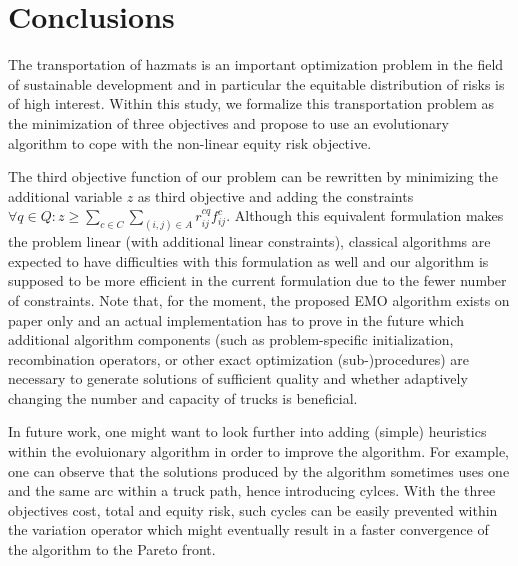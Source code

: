 \documentclass[preprint,12pt]{elsarticle}
\begin{document}
\section{Conclusions} \label{S_FW}
The transportation of hazmats is an important optimization problem in the field of sustainable development and in particular the equitable distribution of risks is of high interest. Within this study, we formalize this transportation problem as the minimization of three objectives and propose to use an evolutionary algorithm to cope with the non-linear equity risk objective.

The third objective function of our problem can be rewritten by minimizing the additional variable $z$ as third objective and adding the constraints $\forall q \in Q: z \geq \sum_{c \in C} \sum_{(i,j) \in A} r_{ij}^{cq} f_{ij}^c$. Although this equivalent formulation makes the problem linear (with additional linear constraints), classical algorithms are expected to have difficulties with this formulation as well and our algorithm is supposed to be more efficient in the current formulation due to the fewer number of constraints. Note that, for the moment, the proposed EMO algorithm exists on paper only and an actual implementation has to prove in the future which additional algorithm components (such as problem-specific initialization, recombination operators, or other exact optimization (sub-)procedures) are necessary to generate solutions of sufficient quality and whether adaptively changing the number and capacity of trucks is beneficial.


In future work, one might want to look further into adding (simple) heuristics within the evoluionary algorithm in order to improve the algorithm. For example, one can observe that the solutions produced by the algorithm sometimes uses one and the same arc within a truck path, hence introducing cylces. With the three objectives cost, total and equity risk, such cycles can be easily prevented within the variation operator which might eventually result in a faster convergence of the algorithm to the Pareto front.




\end{document}
